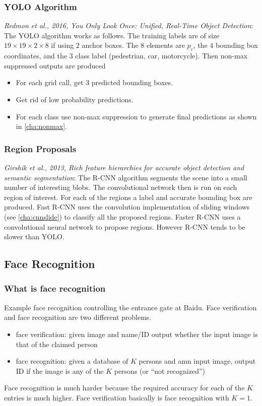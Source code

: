 \documentclass{article}
\begin{document}
\subsubsection{YOLO Algorithm}
\emph{Redmon et al., 2016, You Only Look Once: Unified, Real-Time Object Detection}:
The YOLO algorithm works as follows.
The training labels are of size $19\times 19\times 2\times 8$ if using $2$ anchor boxes.
The $8$ elements are $p_c$, the $4$ bounding box coordinates, and the $3$ class label (pedestrian, car, motorcycle).
Then non-max suppressed outputs are produced
\begin{itemize}
  \item For each grid call, get $3$ predicted bounding boxes.
  \item Get rid of low probability predictions.
  \item For each class use non-max suppression to generate final predictions as shown in \cref{cha:nonmax}.
\end{itemize}

\subsubsection{Region Proposals}
\emph{Girshik et al., 2013, Rich feature hierarchies for accurate object detection and semantic segmentation}:
The R-CNN algorithm segments the scene into a small number of interesting blobs.
The convolutional network then is run on each region of interest.
For each of the regions a label and accurate bounding box are produced.
Fast R-CNN uses the convolution implementation of sliding windows (see \cref{cha:cnnslide}) to classify all the proposed regions.
Faster R-CNN uses a convolutional neural network to propose regions.
However R-CNN tends to be slower than YOLO.

\subsection{Face Recognition}
\subsubsection{What is face recognition}
Example face recognition controlling the entrance gate at Baidu.
Face verification and face recognition are two different problems.
\begin{itemize}
  \item face verification: given image and name/ID output whether the input image is that of the claimed person
  \item face recognition: given a database of $K$ persons and amn input image, output ID if the image is any of the $K$ persons (or ``not recognized'')
\end{itemize}
Face recognition is much harder because the required accuracy for each of the $K$ entries is much higher.
Face verification basically is face recognition with $K=1$.
\end{document}
